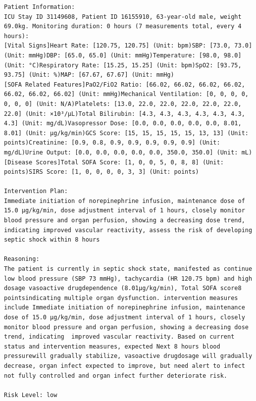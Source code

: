 \documentclass{article}
\begin{document}
\begin{lstlisting}[caption={Result for Patient 31149608}, label={lst:31149608}]
Patient Information:
ICU Stay ID 31149608, Patient ID 16155910, 63-year-old male, weight 69.0kg. Monitoring duration: 0 hours (7 measurements total, every 4 hours):
[Vital Signs]Heart Rate: [120.75, 120.75] (Unit: bpm)SBP: [73.0, 73.0] (Unit: mmHg)DBP: [65.0, 65.0] (Unit: mmHg)Temperature: [98.0, 98.0] (Unit: °C)Respiratory Rate: [15.25, 15.25] (Unit: bpm)SpO2: [93.75, 93.75] (Unit: %)MAP: [67.67, 67.67] (Unit: mmHg)
[SOFA Related Features]PaO2/FiO2 Ratio: [66.02, 66.02, 66.02, 66.02, 66.02, 66.02, 66.02] (Unit: mmHg)Mechanical Ventilation: [0, 0, 0, 0, 0, 0, 0] (Unit: N/A)Platelets: [13.0, 22.0, 22.0, 22.0, 22.0, 22.0, 22.0] (Unit: ×10³/μL)Total Bilirubin: [4.3, 4.3, 4.3, 4.3, 4.3, 4.3, 4.3] (Unit: mg/dL)Vasopressor Dose: [0.0, 0.0, 0.0, 0.0, 0.0, 8.01, 8.01] (Unit: μg/kg/min)GCS Score: [15, 15, 15, 15, 15, 13, 13] (Unit: points)Creatinine: [0.9, 0.8, 0.9, 0.9, 0.9, 0.9, 0.9] (Unit: mg/dL)Urine Output: [0.0, 0.0, 0.0, 0.0, 0.0, 350.0, 350.0] (Unit: mL)
[Disease Scores]Total SOFA Score: [1, 0, 0, 5, 0, 8, 8] (Unit: points)SIRS Score: [1, 0, 0, 0, 0, 3, 3] (Unit: points)

Intervention Plan:
Immediate initiation of norepinephrine infusion, maintenance dose of 15.0 μg/kg/min, dose adjustment interval of 1 hours, closely monitor blood pressure and organ perfusion, showing a decreasing dose trend, indicating improved vascular reactivity, assess the risk of developing septic shock within 8 hours

Reasoning:
The patient is currently in septic shock state, manifested as continue low blood pressure (SBP 73 mmHg), tachycardia (HR 120.75 bpm) and high dosage vasoactive drugdependence (8.01μg/kg/min), Total SOFA score8 pointsindicating multiple organ dysfunction. intervention measures include Immediate initiation of norepinephrine infusion, maintenance dose of 15.0 μg/kg/min, dose adjustment interval of 1 hours, closely monitor blood pressure and organ perfusion, showing a decreasing dose trend, indicating  improved vascular reactivity. Based on current status and intervention measures, expected Next 8 hours blood pressurewill gradually stabilize, vasoactive drugdosage will gradually decrease, organ infect expected to improve, but need alert to infect not fully controlled and organ infect further deteriorate risk.

Risk Level: low
\end{lstlisting}
\end{document}
